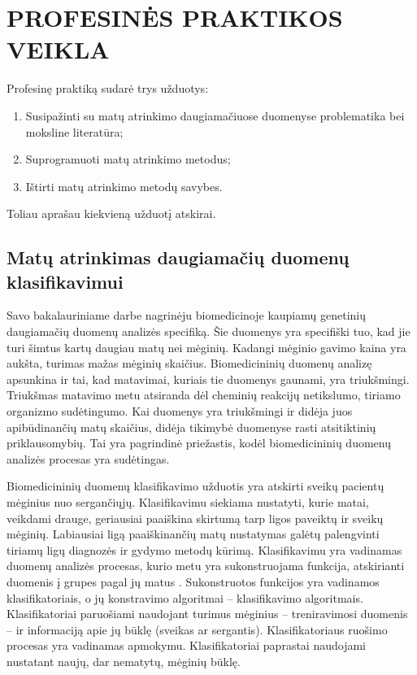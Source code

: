 
\section{PROFESINĖS PRAKTIKOS VEIKLA}
\label{praktikos_veiklos_aprasymas}

Profesinę praktiką sudarė trys užduotys:
\begin{enumerate}
 \item Susipažinti su matų atrinkimo daugiamačiuose duomenyse problematika bei moksline literatūra;
 \item Suprogramuoti matų atrinkimo metodus;
 \item Ištirti matų atrinkimo metodų savybes.
\end{enumerate}
Toliau aprašau kiekvieną užduotį atskirai.

\subsection{Matų atrinkimas daugiamačių duomenų klasifikavimui}

Savo bakalauriniame darbe nagrinėju biomedicinoje kaupiamų genetinių daugiamačių duomenų analizės specifiką. Šie duomenys yra specifiški tuo, kad jie turi šimtus kartų daugiau matų nei mėginių. Kadangi mėginio gavimo kaina yra aukšta, turimas mažas mėginių skaičius. Biomedicininių duomenų analizę apsunkina ir tai, kad matavimai, kuriais tie duomenys gaunami, yra triukšmingi. Triukšmas matavimo metu atsiranda dėl cheminių reakcijų netikslumo, tiriamo organizmo sudėtingumo. Kai duomenys yra triukšmingi ir didėja juos apibūdinančių matų skaičius, didėja tikimybė duomenyse rasti atsitiktinių priklausomybių. Tai yra pagrindinė priežastis, kodėl biomedicininių duomenų analizės procesas yra sudėtingas.

Biomedicininių duomenų klasifikavimo užduotis yra atskirti sveikų pacientų mėginius nuo sergančiųjų. Klasifikavimu siekiama nustatyti, kurie matai, veikdami drauge, geriausiai paaiškina skirtumą tarp ligos paveiktų ir sveikų mėginių. Labiausiai ligą paaiškinančių matų nustatymas galėtų palengvinti tiriamų ligų diagnozės ir gydymo metodų kūrimą. Klasifikavimu yra vadinamas duomenų analizės procesas, kurio metu yra sukonstruojama funkcija, atskirianti duomenis į grupes pagal jų matus \cite{fisher1936use}. Sukonstruotos funkcijos yra vadinamos klasifikatoriais, o jų konstravimo algoritmai -- klasifikavimo algoritmais. Klasifikatoriai paruošiami naudojant turimus mėginius -- treniravimosi duomenis -- ir informaciją apie jų būklę (sveikas ar sergantis). Klasifikatoriaus ruošimo procesas yra vadinamas apmokymu. Klasifikatoriai paprastai naudojami nustatant naujų, dar nematytų, mėginių būklę. 

